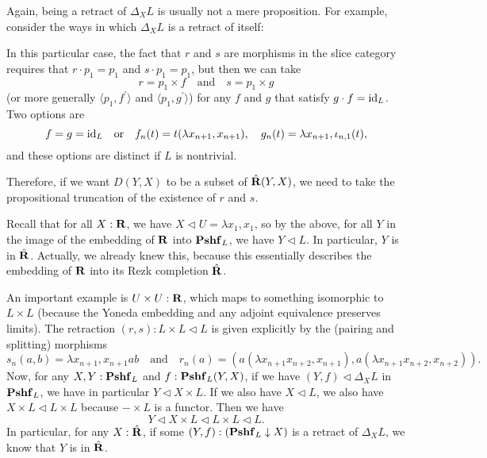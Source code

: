 \begin{remark}
  Again, being a retract of $ \Delta_X L $ is usually not a mere proposition. For example, consider the ways in which $ \Delta_X L $ is a retract of itself:
  \begin{center}
  \end{center}
  In this particular case, the fact that $ r $ and $ s $ are morphisms in the slice category requires that $ r \cdot p_1 = p_1 $ and $ s \cdot p_1 = p_1 $, but then we can take
  \[ r = p_1 \times f \quad \text{and} \quad s = p_1 \times g  \]
  (or more generally $ \langle p_1, f^\prime \rangle $ and $ \langle p_1, g^\prime \rangle $) for any $ f $ and $ g $ that satisfy $ g \cdot f = \text{id}_{L} $. Two options are
  \[ f = g = \text{id}_{L} \quad \text{or} \quad f_n(t) = t (\lambda x_{n + 1}, x_{n + 1}), \quad g_n(t) = \lambda x_{n + 1}, \iota_{n, 1}(t), \]
  and these options are distinct if $ L $ is nontrivial.

  Therefore, if we want $ D(Y, X) $ to be a subset of $ \hat {\mathbf{R}}(Y, X) $, we need to take the propositional truncation of the existence of $ r $ and $ s $.
\end{remark}

\begin{remark}
  Recall that for all $ X : \mathbf{R} $, we have $ X \triangleleft U = \lambda x_1, x_1 $, so by the above, for all $ Y $ in the image of the embedding of $ \mathbf{R} $ into $ \mathbf{Pshf}_{L} $, we have $ Y \triangleleft L $. In particular, $ Y $ is in $ \hat {\mathbf{R}} $. Actually, we already knew this, because this essentially describes the embedding of $ \mathbf{R} $ into its Rezk completion $ \hat {\mathbf{R}} $.

  An important example is $ U \times U : \mathbf{R} $, which maps to something isomorphic to $ L \times L $ (because the Yoneda embedding and any adjoint equivalence preserves limits). The retraction $ (r, s) : L \times L \triangleleft L $ is given explicitly by the (pairing and splitting) morphisms
  \[ s_n(a, b) = \lambda x_{n + 1}, x_{n + 1} a b \quad \text{and} \quad r_n(a) = (a (\lambda x_{n + 1} x_{n + 2}, x_{n + 1}), a (\lambda x_{n + 1} x_{n + 2}, x_{n + 2})). \]
  Now, for any $ X, Y : \mathbf{Pshf}_{L} $ and $ f : \mathbf{Pshf}_{L}(Y, X) $, if we have $ (Y, f) \triangleleft \Delta_X L $ in $ \mathbf{Pshf}_{L} $, we have in particular $ Y \triangleleft X \times L $. If we also have $ X \triangleleft L $, we also have $ X \times L \triangleleft L \times L $ because $ - \times L $ is a functor. Then we have
  \[ Y \triangleleft X \times L \triangleleft L \times L \triangleleft L. \]
  In particular, for any $ X : \hat {\mathbf{R}} $, if some $ (Y, f) : (\mathbf{Pshf}_{L} \downarrow X) $ is a retract of $ \Delta_X L $, we know that $ Y $ is in $ \hat {\mathbf{R}} $.
\end{remark}

